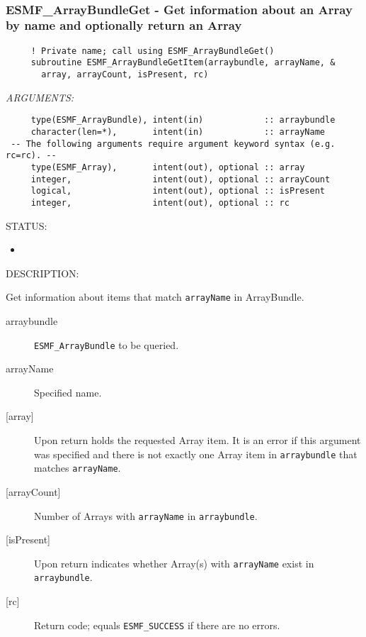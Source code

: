  
\mbox{}\hrulefill\ 
 
\subsubsection [ESMF\_ArrayBundleGet] {ESMF\_ArrayBundleGet - Get information about an Array by name and optionally return an Array}


  
\begin{verbatim}     ! Private name; call using ESMF_ArrayBundleGet()   
     subroutine ESMF_ArrayBundleGetItem(arraybundle, arrayName, &
       array, arrayCount, isPresent, rc)\end{verbatim}{\em ARGUMENTS:}
\begin{verbatim}     type(ESMF_ArrayBundle), intent(in)            :: arraybundle
     character(len=*),       intent(in)            :: arrayName
 -- The following arguments require argument keyword syntax (e.g. rc=rc). --
     type(ESMF_Array),       intent(out), optional :: array
     integer,                intent(out), optional :: arrayCount
     logical,                intent(out), optional :: isPresent
     integer,                intent(out), optional :: rc\end{verbatim}
{\sf STATUS:}
   \begin{itemize}
   \item{}
   \end{itemize}
  
{\sf DESCRIPTION:\\ }


     Get information about items that match {\tt arrayName} in ArrayBundle.
  
     \begin{description}
     \item [arraybundle]
       {\tt ESMF\_ArrayBundle} to be queried.
     \item [arrayName]
       Specified name.
     \item [{[array]}]
       Upon return holds the requested Array item. It is an error if this
       argument was specified and there is not exactly one Array item in 
       {\tt arraybundle} that matches {\tt arrayName}.
     \item [{[arrayCount]}]
       Number of Arrays with {\tt arrayName} in {\tt arraybundle}.
     \item [{[isPresent]}]
       Upon return indicates whether Array(s) with {\tt arrayName} exist
       in {\tt arraybundle}.
     \item [{[rc]}]
       Return code; equals {\tt ESMF\_SUCCESS} if there are no errors.
     \end{description}
   
